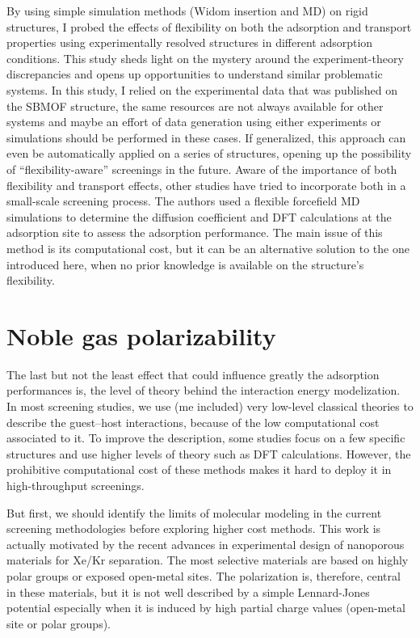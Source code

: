 \documentclass[main]{subfiles}
\begin{document}
By using simple simulation methods (Widom insertion and MD) on rigid structures, I probed the effects of flexibility on both the adsorption and transport properties using experimentally resolved structures in different adsorption conditions. This study sheds light on the mystery around the experiment-theory discrepancies and opens up opportunities to understand similar problematic systems. In this study, I relied on the experimental data that was published on the SBMOF structure, the same resources are not always available for other systems and maybe an effort of data generation using either experiments or simulations should be performed in these cases. If generalized, this approach can even be automatically applied on a series of structures, opening up the possibility of ``flexibility-aware'' screenings in the future. Aware of the importance of both flexibility and transport effects, other studies have tried to incorporate both in a small-scale screening process.\autocite{Stanton_2022} The authors used a flexible forcefield MD simulations to determine the diffusion coefficient and DFT calculations at the adsorption site to assess the adsorption performance. The main issue of this method is its computational cost, but it can be an alternative solution to the one introduced here, when no prior knowledge is available on the structure’s flexibility. 

\section{Noble gas polarizability}

The last but not the least effect that could influence greatly the adsorption performances is, the level of theory behind the interaction energy modelization. In most screening studies, we use (me included) very low-level classical theories to describe the guest--host interactions, because of the low computational cost associated to it. To improve the description, some studies focus on a few specific structures and use higher levels of theory such as DFT calculations. However, the prohibitive computational cost of these methods makes it hard to deploy it in high-throughput screenings. 

But first, we should identify the limits of molecular modeling in the current screening methodologies before exploring higher cost methods. This work is actually motivated by the recent advances in experimental design of nanoporous materials for Xe/Kr separation. The most selective materials are based on highly polar groups or exposed open-metal sites.\autocite{Li_2019,Pei_2022} The polarization is, therefore, central in these materials, but it is not well described by a simple Lennard-Jones potential especially when it is induced by high partial charge values (open-metal site or polar groups). 
\end{document}
